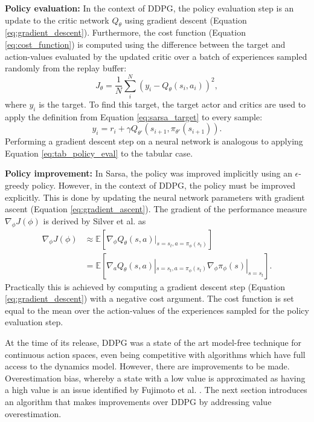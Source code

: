 \textbf{Policy evaluation:}
In the context of DDPG, the policy evaluation step is an update to the critic network $Q_{\theta}$ using gradient descent (Equation \ref{eq:gradient_descent}).
Furthermore, the cost function (Equation \ref{eq:cost_function}) is computed using the difference between the target and action-values evaluated by the updated critic over a batch of experiences sampled randomly from the replay buffer:
\begin{equation}
    J_{\theta}=\frac{1}{N} \sum_{i}^{N} (y_i - Q_{\theta}(s_i,a_i))^2,
\end{equation}
where $y_i$ is the target.
To find this target, the target actor and critics are used to apply the definition from Equation \ref{eq:sarsa_target} to every sample:
\begin{equation}
    y_i = r_i + \gamma Q_{\theta'}(s_{i+1}, \pi_{\theta'}(s_{i+1})).
\end{equation}
Performing a gradient descent step on a neural network is analogous to applying Equation \ref{eq:tab_policy_eval} to the tabular case.

\textbf{Policy improvement:}
In Sarsa, the policy was improved implicitly using an $\epsilon$-greedy policy. 
However, in the context of DDPG, the policy must be improved explicitly.
This is done by updating the neural network parameters with gradient ascent (Equation \ref{eq:gradient_ascent}).
The gradient of the performance measure $\nabla_{\phi}J(\phi)$ is derived by Silver et al. \cite{silver2014} as
\begin{equation}
\begin{split}
    \nabla_{\phi} J(\phi) &\approx \mathbb{E}[ \nabla_{\phi} Q_{\theta}(s,a) |_{s=s_t, a=\pi_{\phi}(s_t)}]\\
    &= \mathbb{E} [ \nabla_{a} Q_{\theta}(s,a)|_{s=s_t, a=\pi_{\phi}(s_t)} \nabla_{\phi} \pi_{\phi}(s)|_{s=s_t}].
    \label{eq:deterministic_policy_gradient}
    \end{split}
\end{equation}
Practically this is achieved by computing a gradient descent step (Equation \ref{eq:gradient_descent}) with a negative cost argument.
The cost function is set equal to the mean over the action-values of the experiences sampled for the policy evaluation step.

At the time of its release, DDPG was a state of the art model-free technique for continuous action spaces, even being competitive with algorithms which have full access to the dynamics model. 
However, there are improvements to be made.
Overestimation bias, whereby a state with a low value is approximated as having a high value is an issue identified by Fujimoto et al. \cite{Fujimoto2018}. 
The next section introduces an algorithm that makes improvements over DDPG by addressing value overestimation.


